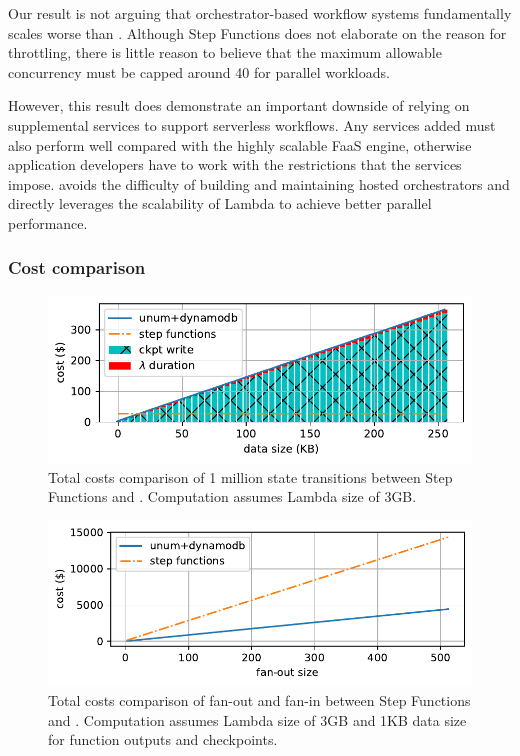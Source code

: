 Our result is not arguing that orchestrator-based workflow systems
fundamentally scales worse than \name{}. Although Step Functions does not
elaborate on the reason for throttling, there is little reason to believe that
the maximum allowable concurrency must be capped around 40 for parallel
workloads.

However, this result does demonstrate an important downside of relying on
supplemental services to support serverless workflows. Any services added must
also perform well compared with the highly scalable FaaS engine, otherwise
application developers have to work with the restrictions that the services
impose. \name{} avoids the difficulty of building and maintaining hosted
orchestrators and directly leverages the scalability of Lambda to achieve
better parallel performance.

\subsubsection{Cost comparison}

\begin{figure}[t!]
    \centering
    \includegraphics[width=\columnwidth]{figures/TotalCost.pdf}
    \caption{Total costs comparison of 1 million state transitions between
    Step Functions and \name{}. Computation assumes Lambda size of 3GB.}
    \label{fig:total-costs-single}
\end{figure}

\begin{figure}[t!]
    \centering
    \includegraphics[width=\columnwidth]{figures/TotalMapCost.pdf}
    \caption{Total costs comparison of fan-out and fan-in between Step
    Functions and \name{}. Computation assumes Lambda size of 3GB and 1KB data
    size for function outputs and checkpoints.}
    \label{fig:total-costs-map}
\end{figure}



